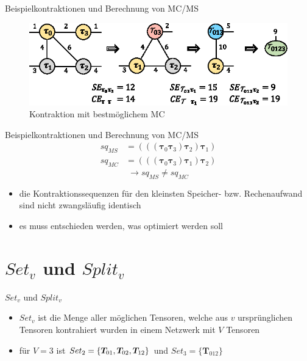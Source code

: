 \documentclass{beamer}
\begin{document}
\begin{frame}{Beispielkontraktionen und Berechnung von MC/MS}
	\begin{figure}
		\includegraphics{figure_03_d}
		\caption*{Kontraktion mit bestmöglichem MC}
	\end{figure}
\end{frame}

\begin{frame}{Beispielkontraktionen und Berechnung von MC/MS}
	\begin{align*}
		sq_{MS} & = (((\bm{\tau}_{0} \bm{\tau}_{3}) \bm{\tau}_{2}) \bm{\tau}_{1}) \\
		sq_{MC} & = (((\bm{\tau}_{0} \bm{\tau}_{3}) \bm{\tau}_{1}) \bm{\tau}_{2})
	\end{align*}
	\begin{equation*}
		\rightarrow sq_{MS} \neq sq_{MC}
	\end{equation*}
	\begin{itemize}
		\item die Kontraktionssequenzen für den kleinsten Speicher- bzw. Rechenaufwand sind nicht zwangsläufig identisch
		\item es muss entschieden werden, was optimiert werden soll
	\end{itemize}
\end{frame}


\section{$Set_v$ und $Split_v$}

\begin{frame}{$Set_v$ und $Split_v$}
	\begin{itemize}
		\item $Set_v$ ist die Menge aller möglichen Tensoren, welche aus $v$ ursprünglichen Tensoren kontrahiert wurden in einem Netzwerk mit $V$ Tensoren
		\item für $V = 3$ ist $Set_2 = \{\bm{T}_{01}, \bm{T_}{02}, \bm{T}_{12} \}$ und $Set_3 = \{\bm{T}_{012} \}$
	\end{itemize}
\end{frame}
\end{document}
